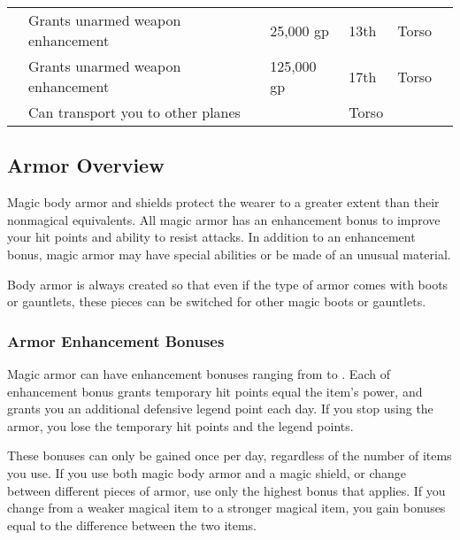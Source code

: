\begin{longtabuwrapper}
\begin{longtabu}{l X l l l l}
                  & Grants  unarmed weapon enhancement & 25,000 gp & 13th & Torso &  \\
                  & Grants  unarmed weapon enhancement & 125,000 gp & 17th & Torso &  \\
                 & Can transport you to other planes &  & Torso &  \\
            \end{longtabu}
        \end{longtabuwrapper}

        \twocolumn

    \subsection{Armor Overview}

        Magic body armor and shields protect the wearer to a greater extent than their nonmagical equivalents.
        All magic armor has an enhancement bonus to improve your hit points and ability to resist attacks.
        In addition to an enhancement bonus, magic armor may have special abilities or be made of an unusual material.

        Body armor is always created so that even if the type of armor comes with boots or gauntlets, these pieces can be switched for other magic boots or gauntlets.

        \subsubsection{Armor Enhancement Bonuses}\label{Armor Enhancement Bonuses}

            Magic armor can have enhancement bonuses ranging from  to .
            Each  of enhancement bonus grants temporary hit points equal the item's power, and grants you an additional defensive legend point each day.
            If you stop using the armor, you lose the temporary hit points and the legend points.

            These bonuses can only be gained once per day, regardless of the number of items you use.
            If you use both magic body armor and a magic shield, or change between different pieces of armor, use only the highest bonus that applies.
            If you change from a weaker magical item to a stronger magical item, you gain bonuses equal to the difference between the two items.

